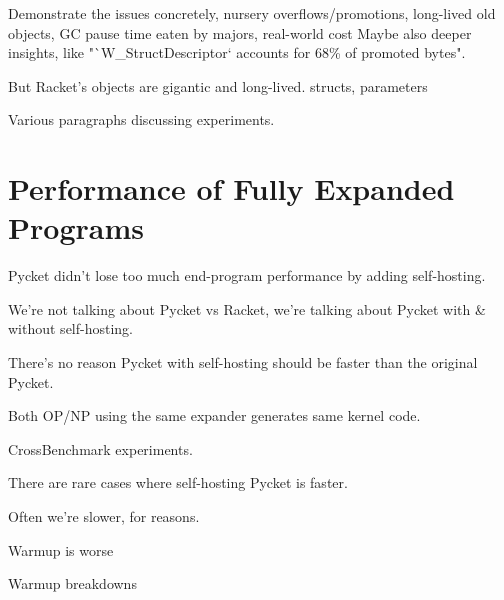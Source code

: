 		\begin{show-experiment}
				Demonstrate the issues concretely, nursery overflows/promotions, long-lived old objects, GC pause time eaten by majors, real-world cost
				Maybe also deeper insights, like "`W\_StructDescriptor` accounts for 68\% of promoted bytes".
		\end{show-experiment}

		\begin{paragraph-here}
			But Racket's objects are gigantic and long-lived.	structs, parameters
		\end{paragraph-here}

		\begin{paragraph-here}
			Various paragraphs discussing experiments.
		\end{paragraph-here}

	\section{Performance of Fully Expanded Programs}
	\label{section:cross-benchmarks}

		\begin{mainpoint}
				Pycket didn't lose too much end-program performance by adding self-hosting.
		\end{mainpoint}

		\begin{paragraph-here}
			We're not talking about Pycket vs Racket, we're talking about Pycket with \& without self-hosting.
		\end{paragraph-here}

		\begin{paragraph-here}
			There’s no reason Pycket with self-hosting should be faster than the original Pycket.

			Both OP/NP using the same expander generates same kernel code.
		\end{paragraph-here}

		\begin{show-experiment}
			CrossBenchmark experiments.
		\end{show-experiment}

		\begin{paragraph-here}
			There are rare cases where self-hosting Pycket is faster.
		\end{paragraph-here}

		\begin{paragraph-here}
			 Often we're slower, for reasons.
		\end{paragraph-here}

		\begin{paragraph-here}
			Warmup is worse
		\end{paragraph-here}

		\begin{show-experiment}
			Warmup breakdowns
		\end{show-experiment}




